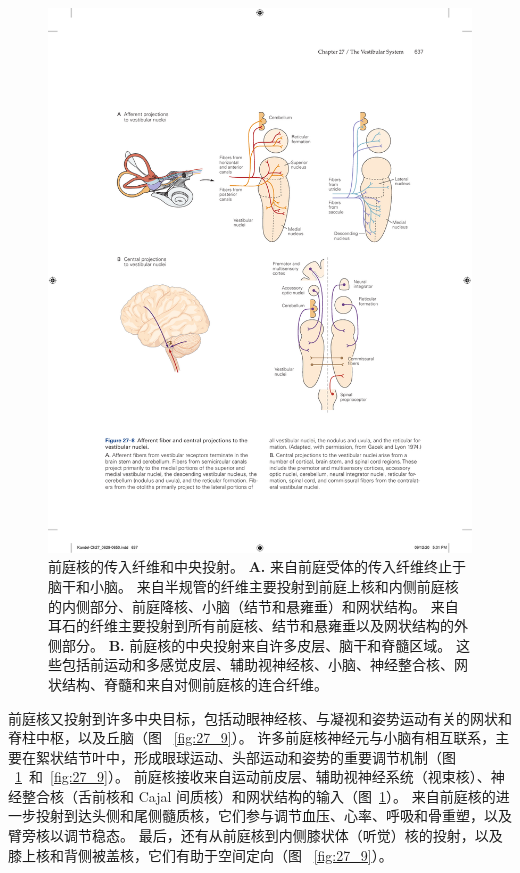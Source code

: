 \begin{figure}[htbp]
	\centering
	\includegraphics[width=0.8\linewidth]{chap27/fig_27_8}
	\caption{前庭核的传入纤维和中央投射。
		\textbf{A.} 来自前庭受体的传入纤维终止于脑干和小脑。
		来自半规管的纤维主要投射到前庭上核和内侧前庭核的内侧部分、前庭降核、小脑（结节和悬雍垂）和网状结构。
		来自耳石的纤维主要投射到所有前庭核、结节和悬雍垂以及网状结构的外侧部分\cite{gacek1974localization}。
		\textbf{B.} 前庭核的中央投射来自许多皮层、脑干和脊髓区域。
		这些包括前运动和多感觉皮层、辅助视神经核、小脑、神经整合核、网状结构、脊髓和来自对侧前庭核的连合纤维。}
	\label{fig:27_8}
\end{figure}


前庭核又投射到许多中央目标，包括动眼神经核、与凝视和姿势运动有关的网状和脊柱中枢，以及丘脑（图 ~\ref{fig:27_9}）。
许多前庭核神经元与小脑有相互联系，主要在絮状结节叶中，形成眼球运动、头部运动和姿势的重要调节机制（图 ~\ref{fig:27_8}~和~\ref{fig:27_9}）。
前庭核接收来自运动前皮层、辅助视神经系统（视束核）、神经整合核（舌前核和 Cajal 间质核）和网状结构的输入（图~\ref{fig:27_8}）。
来自前庭核的进一步投射到达头侧和尾侧髓质核，它们参与调节血压、心率、呼吸和骨重塑，以及臂旁核以调节稳态。
最后，还有从前庭核到内侧膝状体（听觉）核的投射，以及膝上核和背侧被盖核，它们有助于空间定向（图 ~\ref{fig:27_9}）。


